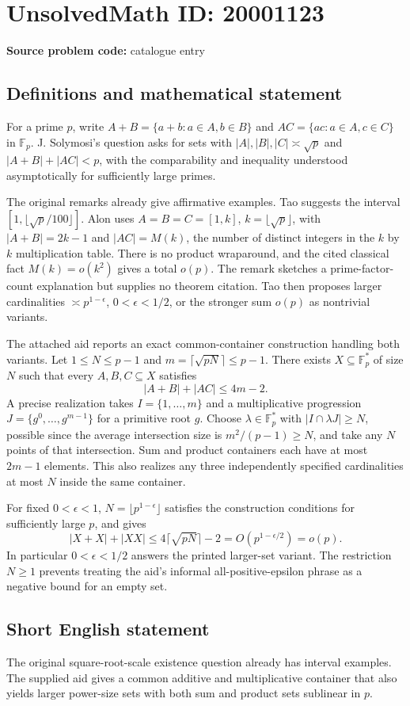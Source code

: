 \documentclass[11pt]{article}
\newcommand{\F}{\mathbb{F}}
\begin{document}
\section*{UnsolvedMath ID: 20001123}
\textbf{Source problem code:} catalogue entry
\subsection{Definitions and mathematical statement}
For a prime $p$, write $A+B=\{a+b:a\in A,b\in B\}$ and $AC=\{ac:a\in A,c\in C\}$ in $\F_p$. J. Solymosi's question asks for sets with $|A|,|B|,|C|\asymp\sqrt p$ and $|A+B|+|AC|<p$, with the comparability and inequality understood asymptotically for sufficiently large primes.

The original remarks already give affirmative examples. Tao suggests the interval $[1,\lfloor\sqrt p/100\rfloor]$. Alon uses $A=B=C=[1,k]$, $k=\lfloor\sqrt p\rfloor$, with $|A+B|=2k-1$ and $|AC|=M(k)$, the number of distinct integers in the $k$ by $k$ multiplication table. There is no product wraparound, and the cited classical fact $M(k)=o(k^2)$ gives a total $o(p)$. The remark sketches a prime-factor-count explanation but supplies no theorem citation. Tao then proposes larger cardinalities $\asymp p^{1-\epsilon}$, $0<\epsilon<1/2$, or the stronger sum $o(p)$ as nontrivial variants.

The attached aid reports an exact common-container construction handling both variants. Let $1\le N\le p-1$ and $m=\lceil\sqrt{pN}\rceil\le p-1$. There exists $X\subseteq\F_p^*$ of size $N$ such that every $A,B,C\subseteq X$ satisfies
\[
|A+B|+|AC|\le4m-2.
\]
A precise realization takes $I=\{1,\ldots,m\}$ and a multiplicative progression $J=\{g^0,\ldots,g^{m-1}\}$ for a primitive root $g$. Choose $\lambda\in\F_p^*$ with $|I\cap\lambda J|\ge N$, possible since the average intersection size is $m^2/(p-1)\ge N$, and take any $N$ points of that intersection. Sum and product containers each have at most $2m-1$ elements. This also realizes any three independently specified cardinalities at most $N$ inside the same container.

For fixed $0<\epsilon<1$, $N=\lfloor p^{1-\epsilon}\rfloor$ satisfies the construction conditions for sufficiently large $p$, and gives
\[
|X+X|+|XX|\le4\lceil\sqrt{pN}\rceil-2
=O(p^{1-\epsilon/2})=o(p).
\]
In particular $0<\epsilon<1/2$ answers the printed larger-set variant. The restriction $N\ge1$ prevents treating the aid's informal all-positive-epsilon phrase as a negative bound for an empty set.
\subsection{Short English statement}
The original square-root-scale existence question already has interval examples. The supplied aid gives a common additive and multiplicative container that also yields larger power-size sets with both sum and product sets sublinear in $p$.
\end{document}
